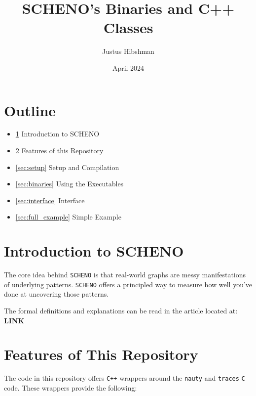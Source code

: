\documentclass{article}
\begin{document}
\title{SCHENO's Binaries and C++ Classes}

\author{Justus Hibshman}

\date{April 2024}

\maketitle

\vspace{2cm}

\section*{Outline}

\begin{itemize}
    \item \ref{sec:nt_intro} Introduction to SCHENO
    \item \ref{sec:features} Features of this Repository
    \item \ref{sec:setup} Setup and Compilation
    \item \ref{sec:binaries} Using the Executables
    \item \ref{sec:interface} Interface
    \item \ref{sec:full_example} Simple Example
\end{itemize}


\newpage

\section{Introduction to SCHENO}\label{sec:nt_intro}

The core idea behind \verb|SCHENO| is that real-world graphs are messy manifestations of underlying patterns. \verb|SCHENO| offers a principled way to measure how well you've done at uncovering those patterns.

The formal definitions and explanations can be read in the article located at: \textbf{LINK}

\section{Features of This Repository}\label{sec:features}

The code in this repository offers \verb|C++| wrappers around the \verb|nauty| and \verb|traces| \verb|C| code. These wrappers provide the following:
\end{document}
